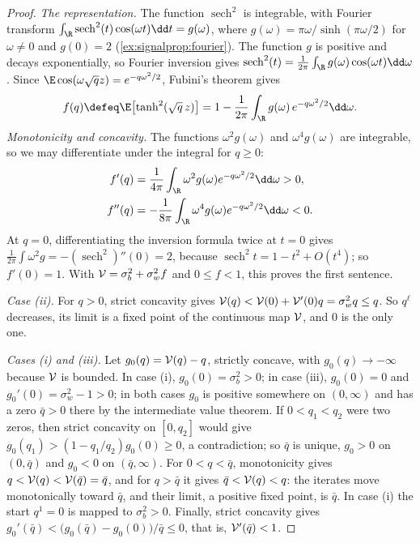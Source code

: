 \begin{refsection}
\begin{proof}
\emph{The representation.} The function $\operatorname{sech}^2$ is integrable, with Fourier transform $\int_\R\operatorname{sech}^2(t)\cos(\omega t)\dd t=g(\omega)$, where $g(\omega)=\pi\omega/\sinh(\pi\omega/2)$ for $\omega\ne0$ and $g(0)=2$ (\cref{ex:signalprop:fourier}). The function $g$ is positive and decays exponentially, so Fourier inversion gives $\operatorname{sech}^2(t)=\frac1{2\pi}\int_\R g(\omega)\cos(\omega t)\dd\omega$. Since $\E\cos(\omega\sqrt q z)=e^{-q\omega^2/2}$, Fubini's theorem gives
\[
  f(q)\defeq\E\bigl[\tanh^2(\sqrt q\,z)\bigr]=1-\frac1{2\pi}\int_\R g(\omega)\,e^{-q\omega^2/2}\dd\omega .
\]
\emph{Monotonicity and concavity.} The functions $\omega^2g(\omega)$ and $\omega^4g(\omega)$ are integrable, so we may differentiate under the integral for $q\ge0$:
\begin{align*}
  f'(q)&=\frac1{4\pi}\int_\R\omega^2g(\omega)e^{-q\omega^2/2}\dd\omega>0,\\
  f''(q)&=-\frac1{8\pi}\int_\R\omega^4g(\omega)e^{-q\omega^2/2}\dd\omega<0 .
\end{align*}
At $q=0$, differentiating the inversion formula twice at $t=0$ gives $\frac1{2\pi}\int\omega^2g=-(\operatorname{sech}^2)''(0)=2$, because $\operatorname{sech}^2t=1-t^2+O(t^4)$; so $f'(0)=1$. With $\mathcal{V}=\sigma_b^2+\sigma_w^2f$ and $0\le f<1$, this proves the first sentence.

\emph{Case (ii).} For $q>0$, strict concavity gives $\mathcal{V}(q)<\mathcal{V}(0)+\mathcal{V}'(0)q=\sigma_w^2q\le q$. So $q^\ell$ decreases, its limit is a fixed point of the continuous map $\mathcal{V}$, and $0$ is the only one.

\emph{Cases (i) and (iii).} Let $g_0(q)=\mathcal{V}(q)-q$, strictly concave, with $g_0(q)\to-\infty$ because $\mathcal{V}$ is bounded. In case (i), $g_0(0)=\sigma_b^2>0$; in case (iii), $g_0(0)=0$ and $g_0'(0)=\sigma_w^2-1>0$; in both cases $g_0$ is positive somewhere on $(0,\infty)$ and has a zero $\bar q>0$ there by the intermediate value theorem. If $0<q_1<q_2$ were two zeros, then strict concavity on $[0,q_2]$ would give $g_0(q_1)>(1-q_1/q_2)g_0(0)\ge0$, a contradiction; so $\bar q$ is unique, $g_0>0$ on $(0,\bar q)$ and $g_0<0$ on $(\bar q,\infty)$. For $0<q<\bar q$, monotonicity gives $q<\mathcal{V}(q)<\mathcal{V}(\bar q)=\bar q$, and for $q>\bar q$ it gives $\bar q<\mathcal{V}(q)<q$: the iterates move monotonically toward $\bar q$, and their limit, a positive fixed point, is $\bar q$. In case (i) the start $q^1=0$ is mapped to $\sigma_b^2>0$. Finally, strict concavity gives $g_0'(\bar q)<\bigl(g_0(\bar q)-g_0(0)\bigr)/\bar q\le0$, that is, $\mathcal{V}'(\bar q)<1$.
\end{proof}


\end{refsection}
